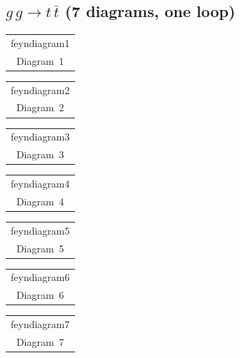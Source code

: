 \documentclass[a4paper,11pt]{article}
\makeatletter
\newcommand{\FeynDiagram}[1]{\csname feyndiagram#1\endcsname}
\newcommand{\FeynCell}[1]{\begin{tabular}[t]{@{}c@{}}\FeynDiagram{#1}\\[1ex]\small Diagram~#1\end{tabular}}
\makeatother
\begin{document}
\setlength{\parindent}{0pt}
\subsection*{$g\,g \to t\,\bar{t}$ \normalfont(7 diagrams, one loop)}
\noindent \FeynCell{1}\hfill \FeynCell{2}\hfill \FeynCell{3}\par\bigskip
\noindent \FeynCell{4}\hfill \FeynCell{5}\hfill \FeynCell{6}\par\bigskip
\noindent \FeynCell{7}\par\bigskip
\end{document}
